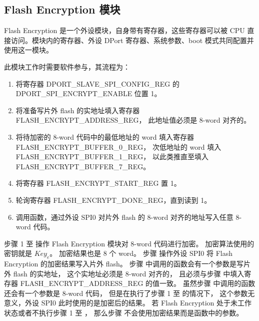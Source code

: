 \documentclass[main\_\_CN.tex]{subfiles}
\begin{document}
\subsection{Flash Encryption 模块}

Flash Encryption 是一个外设模块，自身带有寄存器，这些寄存器可以被 CPU 直接访问。模块内的寄存器、外设 DPort 寄存器、系统参数、boot 模式共同配置并使用这一模块。

此模块工作时需要软件参与，其流程为：

\begin{enumerate}
    \item 将寄存器 DPORT\_SLAVE\_SPI\_CONFIG\_REG 的 DPORT\_SPI\_ENCRYPT\_ENABLE 位置 1。
    \item 将准备写片外 flash 的实地址填入寄存器 FLASH\_ENCRYPT\_ADDRESS\_REG，
    此地址值必须是 8-word 对齐的。
    \setcounter{STEP_W_ADDR}{\theenumi}
    \item 将待加密的 8-word 代码中的最低地址的 word 填入寄存器 FLASH\_ENCRYPT\_BUFFER\_0\_REG，
    次低地址的 word 填入 FLASH\_ENCRYPT\_BUFFER\_1\_REG，
    以此类推直至填入 FLASH\_ENCRYPT\_BUFFER\_7\_REG。
    \item 将寄存器 FLASH\_ENCRYPT\_START\_REG 置 1。
    \item 轮询寄存器 FLASH\_ENCRYPT\_DONE\_REG，直到读到 1。
    \setcounter{STEP_POLL}{\theenumi}
    \item 调用函数，通过外设 SPI0 对片外 flash 的 8-word 对齐的地址写入任意 8-word 代码。
    \setcounter{STEP_W_FLASH}{\theenumi}
\end{enumerate}

步骤 1 至  操作 Flash Encryption 模块对 8-word 代码进行加密。
加密算法使用的密钥就是 \begin{math}Key_{e}\end{math}。
加密结果也是 8 个 word。
步骤  操作外设 SPI0 将 Flash Encryption 的加密结果写入片外 flash。
步骤  中调用的函数会有一个参数是写片外 flash 的实地址，
这个实地址必须是 8-word 对齐的，
且必须与步骤  中填入寄存器 FLASH\_ENCRYPT\_ADDRESS\_REG 的值一致。
虽然步骤  中调用的函数还会有一个参数是 8-word 代码，
但是在执行了步骤 1 至  的情况下，
这个参数无意义，外设 SPI0 此时使用的是加密后的结果。
若 Flash Encryption 处于未工作状态或者不执行步骤 1 至 ，
那么步骤  不会使用加密结果而是函数中的参数。
\end{document}
